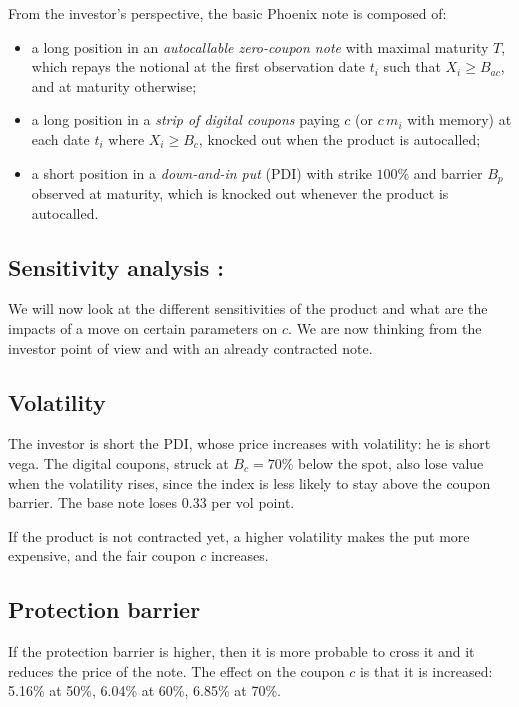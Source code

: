 \documentclass[11pt,a4paper]{article}
\begin{document}
From the investor's perspective, the basic Phoenix note is composed of:
\begin{itemize}
  \item a long position in an \emph{autocallable zero-coupon note} with
        maximal maturity $T$, which repays the notional at the first
        observation date $t_i$ such that $X_i \geq B_{ac}$, and at maturity
        otherwise;
  \item a long position in a \emph{strip of digital coupons} paying $c$ (or
        $c\, m_i$ with memory) at each date $t_i$ where $X_i \ge B_c$, knocked
        out when the product is autocalled;
  \item a short position in a \emph{down-and-in put} (PDI) with strike
        $100\%$ and barrier $B_p$ observed at maturity, which is knocked
        out whenever the product is autocalled.
\end{itemize}


\subsection{Sensitivity analysis :}

We will now look at the different sensitivities of the product and what are the impacts of a move on certain
parameters on $c$. We are now thinking from the investor point of view and with an already contracted note.


\subsection*{Volatility}

The investor is short the PDI, whose price increases with volatility: he is short vega. The digital coupons, struck
at $B_c = 70\%$ below the spot, also lose value when the volatility rises, since the index is less likely to stay
above the coupon barrier. The base note loses 0.33 per vol point.

If the product is not contracted yet, a higher volatility makes the put more expensive, and the fair coupon $c$
increases.


\subsection*{Protection barrier}

If the protection barrier is higher, then it is more probable to cross it and it reduces the price of the note. The
effect on the coupon $c$ is that it is increased: 5.16\% at 50\%, 6.04\% at 60\%, 6.85\% at 70\%.
\end{document}
